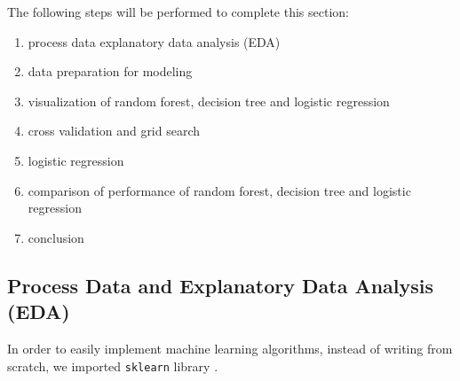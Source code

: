 \documentclass[11pt,a4paper]{article}
\begin{document}
    
    \noindent
    The following steps will be performed to complete this section:
    \begin{enumerate}
        \item process data explanatory data analysis (EDA)
        \item data preparation for modeling
        \item visualization of random forest, decision tree and logistic regression
        \item cross validation and grid search
        \item logistic regression
        \item comparison of performance of random forest, decision tree and logistic regression
        \item conclusion
    \end{enumerate}
    
    \subsection{Process Data and Explanatory Data Analysis (EDA)}



    In order to easily implement machine learning algorithms, instead of writing from scratch, we imported \texttt{sklearn} library \cite{sklearn_api}.
    
    
\end{document}
